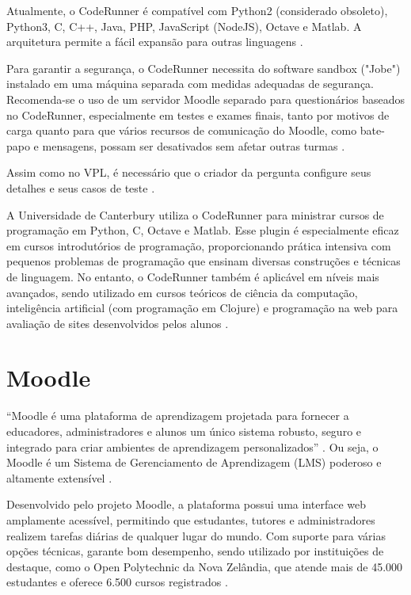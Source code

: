 Atualmente, o CodeRunner é compatível com Python2 (considerado obsoleto), Python3, C, C++, Java, PHP, JavaScript (NodeJS), Octave e Matlab. A arquitetura permite a fácil expansão para outras linguagens \cite{moodle}.

Para garantir a segurança, o CodeRunner necessita do software sandbox ("Jobe") instalado em uma máquina separada com medidas adequadas de segurança. Recomenda-se o uso de um servidor Moodle separado para questionários baseados no CodeRunner, especialmente em testes e exames finais, tanto por motivos de carga quanto para que vários recursos de comunicação do Moodle, como bate-papo e mensagens, possam ser desativados sem afetar outras turmas \cite{coderunner}.

Assim como no VPL, é necessário que o criador da pergunta configure seus detalhes e seus casos de teste \cite{coderunner}.

A Universidade de Canterbury utiliza o CodeRunner para ministrar cursos de programação em Python, C, Octave e Matlab. Esse plugin é especialmente eficaz em cursos introdutórios de programação, proporcionando prática intensiva com pequenos problemas de programação que ensinam diversas construções e técnicas de linguagem. No entanto, o CodeRunner também é aplicável em níveis mais avançados, sendo utilizado em cursos teóricos de ciência da computação, inteligência artificial (com programação em Clojure) e programação na web para avaliação de sites desenvolvidos pelos alunos \cite[p.~48]{lobbharlow}.

\section{Moodle}

“Moodle é uma plataforma de aprendizagem projetada para fornecer a educadores, administradores e alunos um único sistema robusto, seguro e integrado para criar ambientes de aprendizagem personalizados” \cite{moodle}. Ou seja, o Moodle é um Sistema de Gerenciamento de Aprendizagem (LMS) poderoso e altamente extensível \cite{moodle}. 

Desenvolvido pelo projeto Moodle, a plataforma possui uma interface web amplamente acessível, permitindo que estudantes, tutores e administradores realizem tarefas diárias de qualquer lugar do mundo. Com suporte para várias opções técnicas, garante bom desempenho, sendo utilizado por instituições de destaque, como o Open Polytechnic da Nova Zelândia, que atende mais de 45.000 estudantes e oferece 6.500 cursos registrados \cite{moodle}. 

